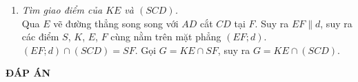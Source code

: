 \begin{bt}
{\begin{enumerate}
			Ta có: $BC\parallel AD$, $BC\subset (SBC)$ và $AD\subset (SAD)$.\\
			Gọi $d=(SBC)\cap (SAD)$ $\Rightarrow d\parallel BC\parallel AD$ và $S\in d$ $\Rightarrow d$ cố định (vì $S.ABCD$ cố định) \textbf{(1)}\\
			Lại có: $MN\subset (SBC)$; $PQ\subset (SAD)$ và $PQ\cap MN=K\Rightarrow K\in (SBC)\cap (SAD)$ hay $K\in d$. \textbf{(2)}\\
			Từ (1), (2) suy ra $K$ luôn chạy trên một đường thẳng cố định là giao tuyến của hai mặt phẳng $(SAC)$ và $(SBD)$.
			\item \textit{Tìm giao điểm của $KE$ và $(SCD)$.}\\
			Qua $E$ vẽ đường thẳng song song với $AD$ cắt $CD$ tại $F$. Suy ra $EF \parallel d$, suy ra các điểm $S$, $K$, $E$, $F$ cùng nằm trên mặt phẳng  $(EF;d)$.\\
			$(EF; d)\cap (SCD)=SF$. Gọi $G=KE \cap SF$, suy ra $G=KE \cap (SCD)$.
		\end{enumerate}
	}
\end{bt}

\newpage
\begin{center}
	\textbf{ĐÁP ÁN}
\end{center}
\begin{multicols}{10}
	
\end{multicols}